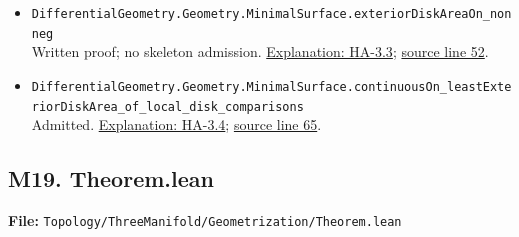 \documentclass[
  letterpaper,
  11pt]{article}
\begin{document}
\begin{itemize}
  \href{https://github.com/qinz1yang/differential-geometry-dev/blob/ea0fae60ee01ef8c8d9b57a51794c6538f679c5d/DifferentialGeometry/Geometry/MinimalSurface/ExteriorDiskArea.lean\#L43}{source
  line 43}.
\item
  {\small\texttt{Differential\allowbreak{}Geometry.\allowbreak{}Geometry.\allowbreak{}Minimal\allowbreak{}Surface.\allowbreak{}exterior\allowbreak{}Disk\allowbreak{}Area\allowbreak{}On\_\allowbreak{}nonneg}}\\
  Written proof; no skeleton admission. \hyperref[ha-3-3]{Explanation:
  HA-3.3};
  \href{https://github.com/qinz1yang/differential-geometry-dev/blob/ea0fae60ee01ef8c8d9b57a51794c6538f679c5d/DifferentialGeometry/Geometry/MinimalSurface/ExteriorDiskArea.lean\#L52}{source
  line 52}.
\item
  {\small\texttt{Differential\allowbreak{}Geometry.\allowbreak{}Geometry.\allowbreak{}Minimal\allowbreak{}Surface.\allowbreak{}continuous\allowbreak{}On\_\allowbreak{}least\allowbreak{}Exterior\allowbreak{}Disk\allowbreak{}Area\_\allowbreak{}of\_\allowbreak{}local\_\allowbreak{}disk\_\allowbreak{}comparisons}}\\
  Admitted. \hyperref[ha-3-4]{Explanation: HA-3.4};
  \href{https://github.com/qinz1yang/differential-geometry-dev/blob/ea0fae60ee01ef8c8d9b57a51794c6538f679c5d/DifferentialGeometry/Geometry/MinimalSurface/ExteriorDiskArea.lean\#L65}{source
  line 65}.
\end{itemize}


\subsection{M19. Theorem.lean}\label{m19.-theorem.lean}

\textbf{File:}
{\small\texttt{Topology/\allowbreak{}Three\allowbreak{}Manifold/\allowbreak{}Geometrization/\allowbreak{}Theorem.\allowbreak{}lean}}
\end{document}
